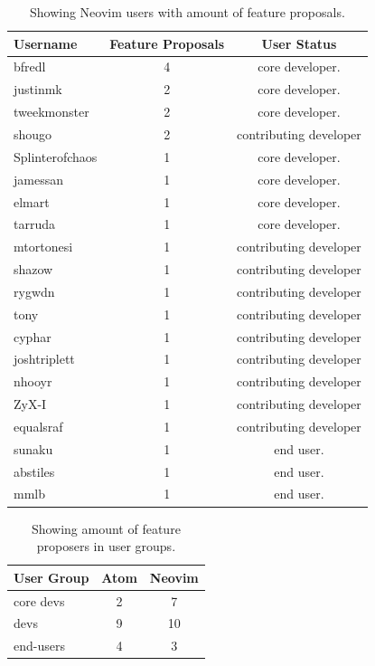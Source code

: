 \documentclass[a4paper,11pt]{article}
\begin{document}
{\begin{table}[h]
	\centering
	\begin{tabular}{ | l | c | c |}
		\hline
		\textbf{Username} 	& \textbf{Feature Proposals}	& \textbf{User Status}	\\\hline
		bfredl			& 4 						& core developer. 		\\\hline
		justinmk			& 2 						& core developer. 		\\\hline
		tweekmonster 		& 2 						& core developer. 		\\\hline
		shougo 			& 2 						& contributing developer	\\\hline
		Splinterofchaos 	& 1						& core developer. 		\\\hline
		jamessan 			& 1 						& core developer. 		\\\hline
		elmart 			& 1 						& core developer. 		\\\hline
		tarruda 			& 1 						& core developer. 		\\\hline
		mtortonesi 		& 1 						& contributing developer	\\\hline
		shazow 			& 1 						& contributing developer	\\\hline
		rygwdn 			& 1 						& contributing developer	\\\hline
		tony 				& 1 						& contributing developer	\\\hline
		cyphar 			& 1 						& contributing developer	\\\hline
		joshtriplett 		& 1 						& contributing developer	\\\hline
		nhooyr 			& 1 						& contributing developer	\\\hline
		ZyX-I 			& 1 						& contributing developer	\\\hline
		equalsraf			& 1		 				& contributing developer	\\\hline
		sunaku 			& 1 						& end user. 			\\\hline
		abstiles			& 1		 				& end user. 			\\\hline
		mmlb 			& 1 						& end user. 			\\
		\hline
	\end{tabular}
	\caption{Showing Neovim users with amount of feature proposals.}
	\label{tab:proposals_neovim}
\end{table}
\begin{table}[h]
	\centering
	\begin{tabular}{ | l | c | c |}
		\hline
		\textbf{User Group} 	& \textbf{Atom} 	& \textbf{Neovim}	\\\hline
		core devs 			& 2 			& 7 				\\\hline
		devs	 			& 9			& 10 				\\\hline
		end-users			& 4			& 3				\\
		\hline
	\end{tabular}
	\caption{Showing amount of feature proposers in user groups.}
	\label{tab:proposals_group}
\end{table}

}
\end{document}
